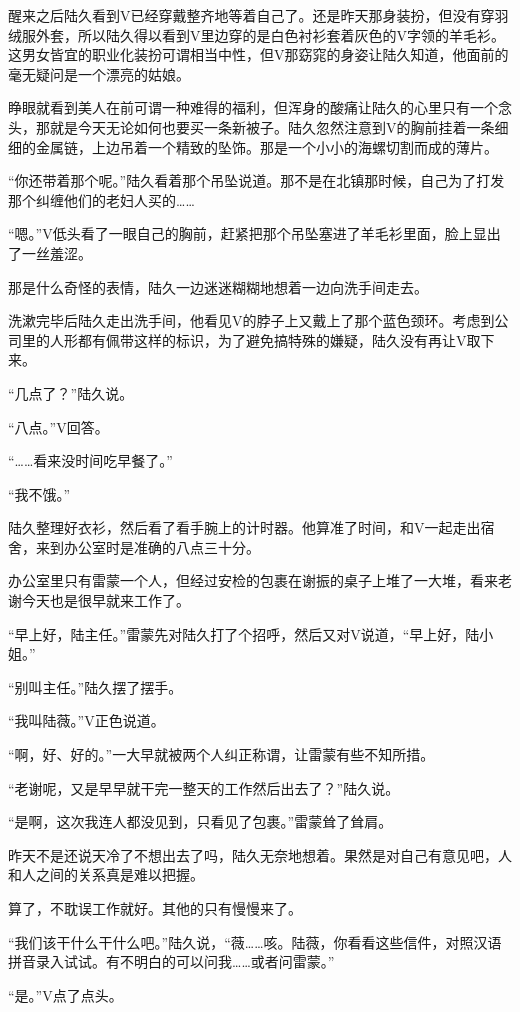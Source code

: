 醒来之后陆久看到V已经穿戴整齐地等着自己了。还是昨天那身装扮，但没有穿羽绒服外套，所以陆久得以看到V里边穿的是白色衬衫套着灰色的V字领的羊毛衫。这男女皆宜的职业化装扮可谓相当中性，但V那窈窕的身姿让陆久知道，他面前的毫无疑问是一个漂亮的姑娘。

睁眼就看到美人在前可谓一种难得的福利，但浑身的酸痛让陆久的心里只有一个念头，那就是今天无论如何也要买一条新被子。陆久忽然注意到V的胸前挂着一条细细的金属链，上边吊着一个精致的坠饰。那是一个小小的海螺切割而成的薄片。

“你还带着那个呢。”陆久看着那个吊坠说道。那不是在北镇那时候，自己为了打发那个纠缠他们的老妇人买的……

“嗯。”V低头看了一眼自己的胸前，赶紧把那个吊坠塞进了羊毛衫里面，脸上显出了一丝羞涩。

那是什么奇怪的表情，陆久一边迷迷糊糊地想着一边向洗手间走去。

洗漱完毕后陆久走出洗手间，他看见V的脖子上又戴上了那个蓝色颈环。考虑到公司里的人形都有佩带这样的标识，为了避免搞特殊的嫌疑，陆久没有再让V取下来。

“几点了？”陆久说。

“八点。”V回答。

“……看来没时间吃早餐了。”

“我不饿。”

陆久整理好衣衫，然后看了看手腕上的计时器。他算准了时间，和V一起走出宿舍，来到办公室时是准确的八点三十分。

办公室里只有雷蒙一个人，但经过安检的包裹在谢振的桌子上堆了一大堆，看来老谢今天也是很早就来工作了。

“早上好，陆主任。”雷蒙先对陆久打了个招呼，然后又对V说道，“早上好，陆小姐。”

“别叫主任。”陆久摆了摆手。

“我叫陆薇。”V正色说道。

“啊，好、好的。”一大早就被两个人纠正称谓，让雷蒙有些不知所措。

“老谢呢，又是早早就干完一整天的工作然后出去了？”陆久说。

“是啊，这次我连人都没见到，只看见了包裹。”雷蒙耸了耸肩。

昨天不是还说天冷了不想出去了吗，陆久无奈地想着。果然是对自己有意见吧，人和人之间的关系真是难以把握。

算了，不耽误工作就好。其他的只有慢慢来了。

“我们该干什么干什么吧。”陆久说，“薇……咳。陆薇，你看看这些信件，对照汉语拼音录入试试。有不明白的可以问我……或者问雷蒙。”

“是。”V点了点头。

